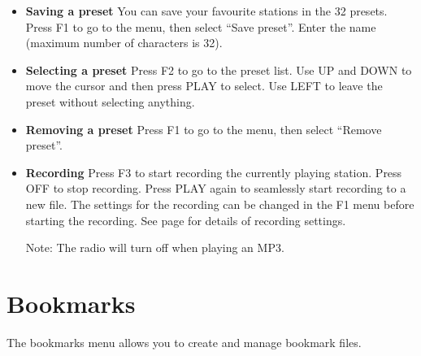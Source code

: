 \begin{itemize}

\item \textbf{Saving a preset}
You can save your favourite stations in the 32 presets. Press F1 to go to the menu, then select ``Save preset''. Enter the name (maximum number of characters is 32).

\item \textbf{Selecting a preset}
Press F2 to go to the preset list. Use UP and DOWN to move the cursor and then press PLAY to select. Use LEFT to leave the preset without selecting anything.

\item \textbf{Removing a preset}
Press F1 to go to the menu, then select ``Remove preset''.

\item \textbf{Recording}
Press F3 to start recording the currently playing station. Press OFF to stop recording. Press PLAY again to seamlessly start recording to a new file. The settings for the recording can be changed in the F1 menu before starting the recording. See page \pageref{ref:Recordingsettings} for details of recording settings.

Note: The radio will turn off when playing an MP3.
\end{itemize}

\section{\label{ref:Bookmarkconfig}\label{ref:Bookmarkmenu}Bookmarks}
The bookmarks menu allows you to create and manage bookmark files.

